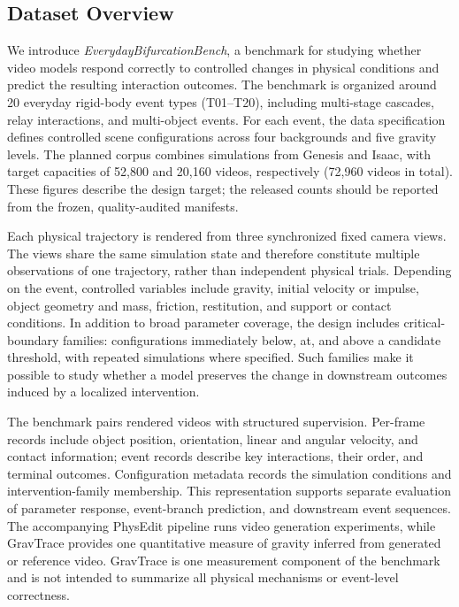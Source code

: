 \subsection{Dataset Overview}
\label{sec:dataset}

We introduce \textit{EverydayBifurcationBench}, a benchmark for studying
whether video models respond correctly to controlled changes in physical
conditions and predict the resulting interaction outcomes. The benchmark is
organized around 20 everyday rigid-body event types (T01--T20), including
multi-stage cascades, relay interactions, and multi-object events. For each
event, the data specification defines controlled scene configurations across
four backgrounds and five gravity levels. The planned corpus combines
simulations from Genesis and Isaac, with target capacities of 52,800 and
20,160 videos, respectively (72,960 videos in total). These figures describe
the design target; the released counts should be reported from the frozen,
quality-audited manifests.

Each physical trajectory is rendered from three synchronized fixed camera
views. The views share the same simulation state and therefore constitute
multiple observations of one trajectory, rather than independent physical
trials. Depending on the event, controlled variables include gravity,
initial velocity or impulse, object geometry and mass, friction, restitution,
and support or contact conditions. In addition to broad parameter coverage,
the design includes critical-boundary families: configurations immediately
below, at, and above a candidate threshold, with repeated simulations where
specified. Such families make it possible to study whether a model preserves
the change in downstream outcomes induced by a localized intervention.

The benchmark pairs rendered videos with structured supervision. Per-frame
records include object position, orientation, linear and angular velocity,
and contact information; event records describe key interactions, their
order, and terminal outcomes. Configuration metadata records the simulation
conditions and intervention-family membership. This representation supports
separate evaluation of parameter response, event-branch prediction, and
downstream event sequences. The accompanying PhysEdit pipeline runs video
generation experiments, while GravTrace provides one quantitative measure of
gravity inferred from generated or reference video. GravTrace is one
measurement component of the benchmark and is not intended to summarize all
physical mechanisms or event-level correctness.

